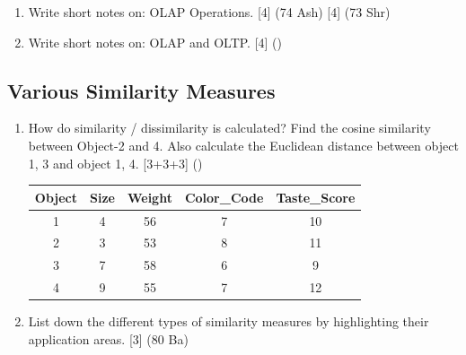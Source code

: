 \documentclass[12pt]{article}
\begin{document}
\begin{enumerate}[topsep=0pt, noitemsep]
      \item Write short notes on: OLAP Operations. \hfill [4] (74 Ash) [4] (73 Shr)

      \item Write short notes on: OLAP and OLTP. \hfill [4] ()
    \end{enumerate}

  \subsection{Various Similarity Measures}
    \begin{enumerate}[topsep=0pt, noitemsep]
      \item How do similarity / dissimilarity is calculated? Find the cosine similarity between Object-2 and 4. Also calculate the Euclidean distance between object 1, 3 and object 1, 4. \hfill [3+3+3] ()\\
        \small
        \begin{tabular}{|c|c|c|c|c|}
          \hline
          Object & Size & Weight & Color\_Code & Taste\_Score \\ \hline
          1 & 4 & 56 & 7 & 10 \\ \hline
          2 & 3 & 53 & 8 & 11 \\ \hline
          3 & 7 & 58 & 6 & 9 \\ \hline
          4 & 9 & 55 & 7 & 12 \\ \hline
        \end{tabular}
        \normalsize

      \item List down the different types of similarity measures by highlighting their application areas. \hfill [3] (80 Ba)


\end{enumerate}
\end{document}
